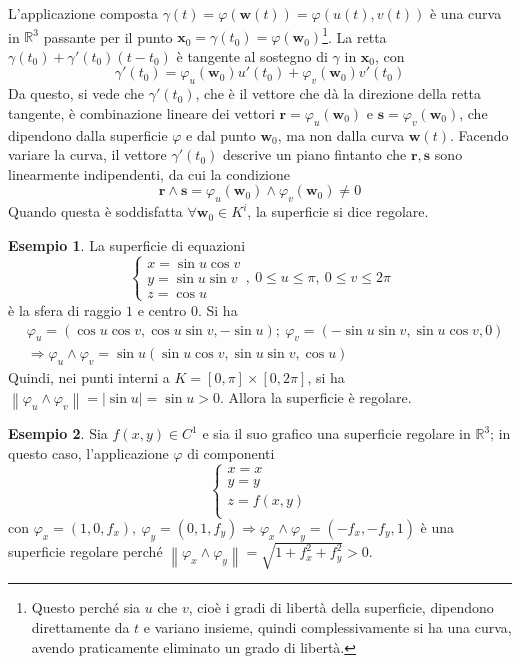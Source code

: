\documentclass[11pt, a4paper]{scrartcl}
\theoremstyle{definition}
\newtheorem{esempio}{Esempio}
\numberwithin{esempio}{section}
\theoremstyle{definition}
\numberwithin{obs}{section}
\numberwithin{nota}{section}
\numberwithin{equation}{subsection}
\begin{document}
L'applicazione composta $\gamma(t) = \varphi (\mathbf{w} (t)) = \varphi (u(t), v(t))$ \`e una curva in $\mathbb{R}^3$ passante per il punto $\mathbf{x} _0 = \gamma(t_0) = \varphi (\mathbf{w} _0)$\footnote{Questo perch\'e sia $u$ che $v$, cio\`e i gradi di libert\`a della superficie, dipendono direttamente da $t$ e variano insieme, quindi complessivamente si ha una curva, avendo praticamente eliminato un grado di libert\`a.}.
La retta $\gamma(t_0) + \gamma'(t_0) (t-t_0)$ \`e tangente al sostegno di $\gamma$ in $\mathbf{x} _0$, con 
\[
\gamma'(t_0) = \varphi _u(\mathbf{w} _0) u'(t_0) + \varphi _v (\mathbf{w} _0) v'(t_0)
\] 
Da questo, si vede che $\gamma'(t_0)$, che \`e il vettore che d\`a la direzione della retta tangente, \`e combinazione lineare dei vettori $\mathbf{r}  = \varphi _u (\mathbf{w} _0)$ e $\mathbf{s} = \varphi _v(\mathbf{w} _0)$, che dipendono dalla superficie $\varphi $ e dal punto $\mathbf{w} _0$, ma non dalla curva $\mathbf{w} (t)$.
Facendo variare la curva, il vettore $\gamma'(t_0)$ descrive un piano fintanto che $\mathbf{r} ,\mathbf{s} $ sono linearmente indipendenti, da cui la condizione
\begin{equation}
	\mathbf{r} \wedge \mathbf{s} = \varphi _u (\mathbf{w} _0) \wedge \varphi _v(\mathbf{w} _0) \neq 0
\end{equation}
Quando questa \`e soddisfatta $\forall \mathbf{w} _0 \in K^i$, la superficie si dice regolare.
\begin{esempio}\label{sf}
La superficie di equazioni
\[
\begin{cases}
	x = \sin u  \cos v\\
	y = \sin u \sin v \\
	z = \cos u
\end{cases}, \ 0\le u\le \pi,\ 0\le  v \le 2\pi
\] 
\`e la sfera di raggio $1$ e centro $0$. 
Si ha
\[
	\begin{split}
		&\varphi _u = (\cos u \cos v , \cos u \sin v, -\sin u); \ \varphi _v = (-\sin u \sin v , \sin u \cos v , 0 )\\
		&\Rightarrow \varphi _u \wedge \varphi _v = \sin u ( \sin u \cos v, \sin u \sin v, \cos u)
	\end{split}
\] 
Quindi, nei punti interni a $K = \left[ 0,\pi \right] \times \left[ 0,2\pi \right] $, si ha $\left\lVert \varphi _u \wedge \varphi _v \right\rVert = \lvert \sin u \rvert  = \sin u  >0 $. 
Allora la superficie \`e regolare.
\end{esempio}
\begin{esempio}
Sia $f(x,y) \in C^1$ e sia il suo grafico una superficie regolare in $\mathbb{R}^3$; in questo caso, l'applicazione $\varphi $ di componenti 
\[
\begin{cases}
	x = x\\
	y= y \\
	z= f(x,y)\\
\end{cases}	
\] 
con $\varphi _x = (1,0,f_x) , \ \varphi _y = (0,1,f_y) \Rightarrow \varphi _x \wedge \varphi _y = (-f_x, -f_y, 1)$ \`e una superficie regolare perch\'e $\left\lVert \varphi _x \wedge \varphi _y \right\rVert = \sqrt{1+ f_x^2 + f_y^2 } > 0$.

\end{esempio}
\end{document}
